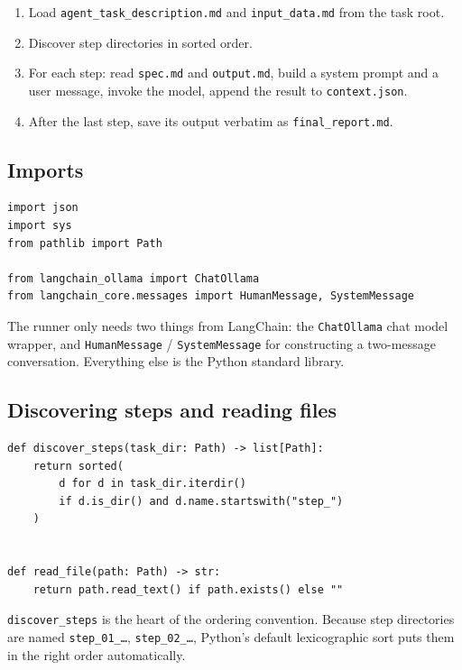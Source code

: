 \documentclass[12pt, a4paper]{article}
\begin{document}
\begin{enumerate}[leftmargin=1.5em]
  \item Load \texttt{agent\_task\_description.md} and \texttt{input\_data.md} from the task root.
  \item Discover step directories in sorted order.
  \item For each step: read \texttt{spec.md} and \texttt{output.md}, build a system prompt and a user message, invoke the model, append the result to \texttt{context.json}.
  \item After the last step, save its output verbatim as \texttt{final\_report.md}.
\end{enumerate}

\subsection{Imports}

\begin{lstlisting}[style=pythonstyle]
import json
import sys
from pathlib import Path

from langchain_ollama import ChatOllama
from langchain_core.messages import HumanMessage, SystemMessage
\end{lstlisting}

The runner only needs two things from LangChain: the \texttt{ChatOllama} chat model wrapper, and \texttt{HumanMessage} / \texttt{SystemMessage} for constructing a two-message conversation. Everything else is the Python standard library.

\subsection{Discovering steps and reading files}

\begin{lstlisting}[style=pythonstyle]
def discover_steps(task_dir: Path) -> list[Path]:
    return sorted(
        d for d in task_dir.iterdir()
        if d.is_dir() and d.name.startswith("step_")
    )


def read_file(path: Path) -> str:
    return path.read_text() if path.exists() else ""
\end{lstlisting}

\texttt{discover\_steps} is the heart of the ordering convention. Because step directories are named \texttt{step\_01\_\ldots}, \texttt{step\_02\_\ldots}, Python's default lexicographic sort puts them in the right order automatically.
\end{document}
